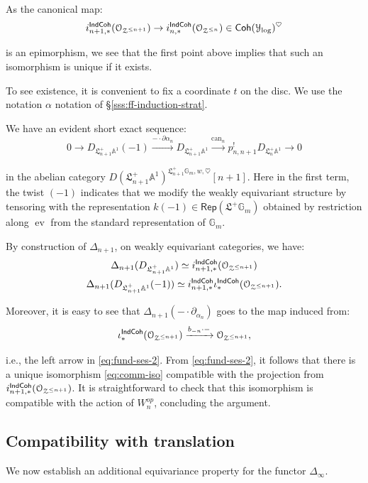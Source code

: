 \documentclass[reqno,11pt]{amsart}
\numberwithin{equation}{subsection}
\theoremstyle{remark}
\newcommand{\xar}[1]{\xrightarrow{#1}}
\newcommand{\bA}{{\mathbb A}}
\newcommand{\bG}{{\mathbb G}}
\newcommand{\sO}{{\EuScript O}}
\newcommand{\sY}{{\EuScript Y}}
\newcommand{\sZ}{{\EuScript Z}}
\newcommand{\fL}{{\mathfrak L}}
\newcommand{\on}{\operatorname}
\newcommand{\ev}{\on{ev}}
\newcommand{\Rep}{\mathsf{Rep}}
\newcommand{\heart}{\heartsuit}
\newcommand{\Coh}{\mathsf{Coh}}
\newcommand{\IndCoh}{\mathsf{IndCoh}}
\begin{document}
As the canonical map:
%
\[
i_{n+1,*}^{\IndCoh}(\sO_{\sZ^{\leq n+1}}) \to 
i_{n,*}^{\IndCoh}(\sO_{\sZ^{\leq n}}) \in \Coh(\sY_{\log})^{\heart}
\]

\noindent is an epimorphism, we see that the first point above 
implies that such an isomorphism is unique if it exists. 

To see existence, it is convenient to fix a coordinate $t$ on the
disc. We use the
notation $\alpha$ notation of \S \ref{sss:ff-induction-strat}. 

We have an evident short exact sequence:
%
\[
0 \to D_{\fL_{n+1}^+ \bA^1}(-1) \xar{-\cdot \partial\alpha_n}
D_{\fL_{n+1}^+ \bA^1} \xar{\on{can}_n} 
p_{n,n+1}^! D_{\fL_n^+ \bA^1} \to 0 
\]

\noindent in the abelian category 
$D(\fL_{n+1}^+\bA^1)^{\fL_{n+1}^+ \bG_m,w,\heart}[n+1]$.
Here in the first term, the twist $(-1)$ indicates that we modify the
weakly equivariant structure by tensoring with the representation 
$k(-1) \in \Rep(\fL^+\bG_m)$ obtained by restriction along $\ev$ from the
standard representation of $\bG_m$.

By construction of $\Delta_{n+1}$, on weakly equivariant
categories, we have:
%
\[
\begin{gathered}
\Delta_{n+1}(D_{\fL_{n+1}^+ \bA^1}) \simeq i_{n+1,*}^{\IndCoh}(\sO_{\sZ^{\leq n+1}}) \\
\Delta_{n+1}(D_{\fL_{n+1}^+ \bA^1}(-1)) 
\simeq i_{n+1,*}^{\IndCoh}\iota_*^{\IndCoh}(\sO_{\sZ^{\leq n+1}}).
\end{gathered}
\]

\noindent Moreover, it is easy to see that $\Delta_{n+1}(-\cdot \partial_{\alpha_n})$
goes to the map induced from:
%
\[
\iota_*^{\IndCoh}(\sO_{\sZ^{\leq n+1}}) \xar{b_{-n}\cdot-} 
\sO_{\sZ^{\leq n+1}},
\]

\noindent i.e., the left arrow in \eqref{eq:fund-ses-2}. From 
\eqref{eq:fund-ses-2}, it follows that there is a unique
isomorphism \eqref{eq:comm-iso} compatible with the projection from 
$i_{n+1,*}^{\IndCoh}(\sO_{\sZ^{\leq n+1}})$. It is straightforward
to check that this isomorphism is compatible with the action of
$W_n^{op}$, concluding the argument.

\subsection{Compatibility with translation}

We now establish an additional equivariance property 
for the functor $\Delta_{\infty}$.
\end{document}
